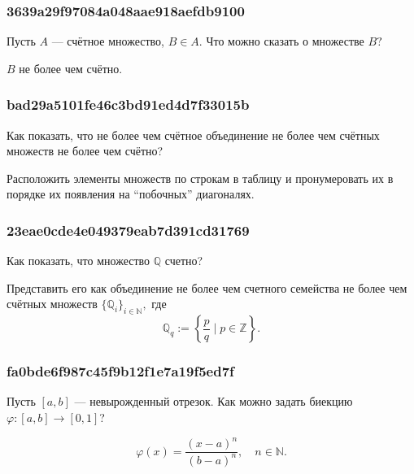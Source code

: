 \documentclass[11pt, a5paper]{article}
\newenvironment{note}[1]{\goodbreak\par\subsubsection{\hfill \color{lightgray}\tiny #1}}{}
\newenvironment{cloze}[2][\ldots]{\begin{leftbar}}{\end{leftbar}}
\begin{document}
    \begin{note}{3639a29f97084a048aae918aefdb9100}
        Пусть \( A \) --- счётное множество, \( B \in A. \) Что можно сказать о
        множестве \( B? \)

        \begin{cloze}{1}
            \( B \) не более чем счётно.
        \end{cloze}
    \end{note}

    \begin{note}{bad29a5101fe46c3bd91ed4d7f33015b}
        Как показать, что не более чем счётное объединение не более чем счётных
        множеств не более чем счётно?

        \begin{cloze}{1}
            Расположить элементы множеств по строкам в таблицу и пронумеровать
            их в порядке их появления на ``побочных'' диагоналях.
        \end{cloze}
    \end{note}

    \begin{note}{23eae0cde4e049379eab7d391cd31769}
        Как показать, что множество \( \mathbb Q  \) счетно?

        \begin{cloze}{1}
            Представить его как объединение не более чем счетного семейства не
            более чем счётных множеств \( \{ \mathbb Q _i \}_{i \in \mathbb N }
            , \) где \[
                \mathbb Q _q := \left\{ \frac{p}{q} \mid p \in \mathbb Z  \right\}.
            \]
        \end{cloze}
    \end{note}

    \begin{note}{fa0bde6f987c45f9b12f1e7a19f5ed7f}
        Пусть \( [a,  b] \) --- невырожденный отрезок. Как можно задать биекцию
        \( \varphi : [a,  b] \to [0, 1] \)?

        \begin{cloze}{1}
            \[
                \varphi(x) = \frac{(x - a)^{n}}{(b - a)^{n}}, \quad n \in
                \mathbb N.
            \]
        \end{cloze}
    \end{note}
\end{document}
